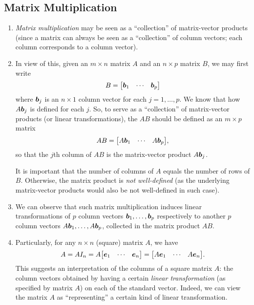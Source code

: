 \subsection{Matrix Multiplication}
\label{subsect:matrix-mult}
\begin{enumerate}
\item \emph{Matrix multiplication} may be seen as a ``collection'' of
matrix-vector products (since a matrix can always be seen as a ``collection''
of column vectors; each column corresponds to a column vector).

\item In view of this, given an \(m\times n\) matrix \(A\) and an \(n\times p\)
matrix \(B\), we may first write
\[
B=\mqty[\vect{b}_{1}&\cdots&\vect{b}_{p}]
\]
where \(\vb*{b}_{j}\) is an \(n\times 1\) column vector for each
\(j=1,\dotsc,p\). We know that how \(A\vb*{b}_{j}\) is defined for each \(j\).
So, to serve as a ``collection'' of matrix-vector products (or linear
transformations), the  \(AB\) should be defined as an
\(m\times p\) matrix
\[
AB=\mqty[A\vect{b}_{1}&\cdots&A\vect{b}_{p}],
\]
so that the \(j\)th column of \(AB\) is the matrix-vector product
\(A\vb*{b}_{j}\).

\begin{note}
It is important that the number of columns of \(A\) equals the number of rows
of \(B\). Otherwise, the matrix product is \emph{not well-defined} (as the
underlying matrix-vector products would also be not well-defined in such case).
\end{note}

\item We can observe that such matrix multiplication induces linear
transformations of \(p\) column vectors \(\vb*{b}_{1},\dotsc,\vb*{b}_{p}\)
respectively to another \(p\) column vectors
\(A\vb*{b}_{1},\dotsc,A\vb*{b}_{p}\), collected in the matrix product \(AB\).

\item \label{it:sq-matrix-geo-interpret}
Particularly, for any \(n\times n\) (square) matrix \(A\), we have
\[
A=AI_n=A\mqty[\vect{e}_{1}&\cdots&\vect{e}_{n}]=\mqty[A\vect{e}_{1}&\cdots&A\vect{e}_{n}].
\]
This suggests an interpretation of the columns of a square matrix \(A\): the
column vectors obtained by having a certain \emph{linear transformation} (as
specified by matrix \(A\)) on each of the standard vector. Indeed, we can view
the matrix \(A\) as ``representing'' a certain kind of linear transformation.


\end{enumerate}
